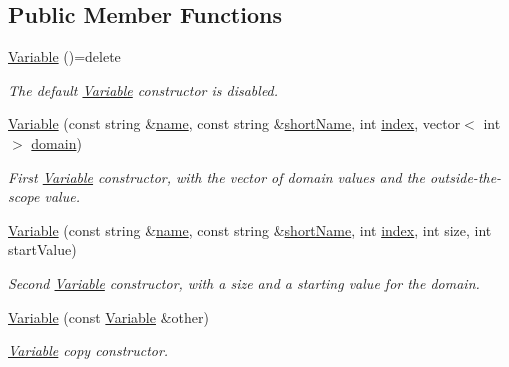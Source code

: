 \subsection*{Public Member Functions}
\begin{DoxyCompactItemize}
\item 
\hyperlink{classghost_1_1Variable_a41d27734b85f60c2e5fda7ee0ab5c600}{Variable} ()=delete
\begin{DoxyCompactList}\small\item\em The default \hyperlink{classghost_1_1Variable}{Variable} constructor is disabled. \end{DoxyCompactList}\item 
\hyperlink{classghost_1_1Variable_ae97be14aabc24f5fe9c1e362d4d317b1}{Variable} (const string \&\hyperlink{classghost_1_1Variable_a05cf4a4cd3a5c033028e0b0f11d1dafd}{name}, const string \&\hyperlink{classghost_1_1Variable_afb5eb79a7f6351b4305fe082699b6d7d}{short\-Name}, int \hyperlink{classghost_1_1Variable_a934efa463fb1897b4266040e321dbc41}{index}, vector$<$ int $>$ \hyperlink{classghost_1_1Variable_ab3d7bfa2e8c2139473775a6b797d0991}{domain})
\begin{DoxyCompactList}\small\item\em First \hyperlink{classghost_1_1Variable}{Variable} constructor, with the vector of domain values and the outside-\/the-\/scope value. \end{DoxyCompactList}\item 
\hyperlink{classghost_1_1Variable_ac25d5b4b8cb81ea813db47a6aef60331}{Variable} (const string \&\hyperlink{classghost_1_1Variable_a05cf4a4cd3a5c033028e0b0f11d1dafd}{name}, const string \&\hyperlink{classghost_1_1Variable_afb5eb79a7f6351b4305fe082699b6d7d}{short\-Name}, int \hyperlink{classghost_1_1Variable_a934efa463fb1897b4266040e321dbc41}{index}, int size, int start\-Value)
\begin{DoxyCompactList}\small\item\em Second \hyperlink{classghost_1_1Variable}{Variable} constructor, with a size and a starting value for the domain. \end{DoxyCompactList}\item 
\hyperlink{classghost_1_1Variable_ac9fb0513e1d15a047816821e034589ea}{Variable} (const \hyperlink{classghost_1_1Variable}{Variable} \&other)
\begin{DoxyCompactList}\small\item\em \hyperlink{classghost_1_1Variable}{Variable} copy constructor. \end{DoxyCompactList}\item 

\end{DoxyCompactItemize}
